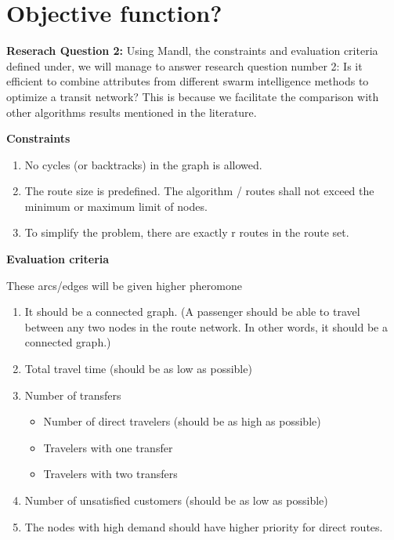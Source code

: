 \section{Objective function?}
\textbf{Reserach Question 2: }
Using Mandl, the constraints and evaluation criteria defined under, we will manage to answer research question number 2: Is it efficient to combine attributes from different swarm intelligence methods to optimize a transit network? This is because we facilitate the comparison with other algorithms results mentioned in the literature. 

\textbf{Constraints}
\begin{enumerate}
\item \label{itm:constraintCycles} No cycles (or backtracks) in the graph is allowed.
\item \label{itm:constraintRouteSize} The route size is predefined. The algorithm / routes shall not exceed the minimum or maximum limit of nodes.
\item \label{itm:constraintRouteSet} To simplify the problem, there are exactly r routes in the route set.
\end{enumerate}

\textbf{Evaluation criteria}
\par
These arcs/edges will be given higher pheromone
\begin{enumerate}
\item \label{itm:criteriaConnectedGraph} It should be a connected graph. (A passenger should be able to travel between any two nodes in the route network. In other words, it should be a connected graph.) 
\item \label{itm:criteriaTotalTravelTime} Total travel time (should be as low as possible)
\item \label{itm:TODO} Number of transfers
\begin{itemize}
\item Number of direct travelers (should be as high as possible)
\item Travelers with one transfer
\item Travelers with two transfers
\end{itemize}
\item \label{itm:TODO} Number of unsatisfied customers (should be as low as possible)
\item \label{itm:TODO} The nodes with high demand should have higher priority for direct routes.
\end{enumerate}

